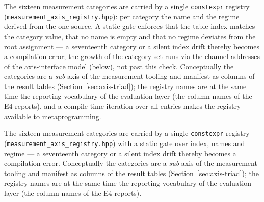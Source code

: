 \begin{nurlang}
The sixteen measurement categories are carried by a single \texttt{constexpr} registry
(\texttt{measurement\_\allowbreak{}axis\_\allowbreak{}registry.hpp}): per category the name and the
regime derived from the one source. A static gate enforces that the table index matches the category
value, that no name is empty and that no regime deviates from the root assignment --- a seventeenth
category or a silent index drift thereby becomes a compilation error; the growth of the category set
runs via the channel addresses of the axis-interface model (below), not past this check. Conceptually
the categories are a \emph{sub}-axis of the measurement tooling and manifest as columns of the result
tables (Section~\ref{sec:axis-triad}); the registry names are at the same time the reporting
vocabulary of the evaluation layer (the column names of the E4 reports), and a compile-time iteration
over all entries makes the registry available to metaprogramming.
\end{nurlang}
\begin{nurkurz}
The sixteen measurement categories are carried by a single \texttt{constexpr} registry
(\texttt{measurement\_\allowbreak{}axis\_\allowbreak{}registry.hpp}) with a static gate over index,
names and regime --- a seventeenth category or a silent index drift thereby becomes a compilation
error. Conceptually the categories are a \emph{sub}-axis of the measurement tooling and manifest as
columns of the result tables (Section~\ref{sec:axis-triad}); the registry names are at the same time
the reporting vocabulary of the evaluation layer (the column names of the E4 reports).
\end{nurkurz}

